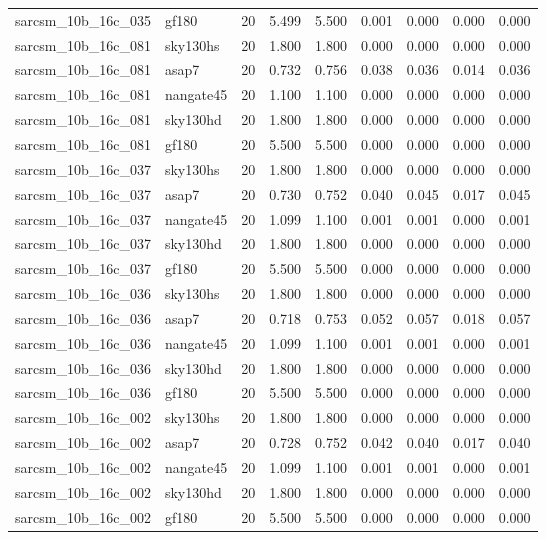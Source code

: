 \begin{tabular}{llrrrrrrr}
sarcsm\_10b\_16c\_035 & gf180 & 20 & 5.499 & 5.500 & 0.001 & 0.000 & 0.000 & 0.000 \\
sarcsm\_10b\_16c\_081 & sky130hs & 20 & 1.800 & 1.800 & 0.000 & 0.000 & 0.000 & 0.000 \\
sarcsm\_10b\_16c\_081 & asap7 & 20 & 0.732 & 0.756 & 0.038 & 0.036 & 0.014 & 0.036 \\
sarcsm\_10b\_16c\_081 & nangate45 & 20 & 1.100 & 1.100 & 0.000 & 0.000 & 0.000 & 0.000 \\
sarcsm\_10b\_16c\_081 & sky130hd & 20 & 1.800 & 1.800 & 0.000 & 0.000 & 0.000 & 0.000 \\
sarcsm\_10b\_16c\_081 & gf180 & 20 & 5.500 & 5.500 & 0.000 & 0.000 & 0.000 & 0.000 \\
sarcsm\_10b\_16c\_037 & sky130hs & 20 & 1.800 & 1.800 & 0.000 & 0.000 & 0.000 & 0.000 \\
sarcsm\_10b\_16c\_037 & asap7 & 20 & 0.730 & 0.752 & 0.040 & 0.045 & 0.017 & 0.045 \\
sarcsm\_10b\_16c\_037 & nangate45 & 20 & 1.099 & 1.100 & 0.001 & 0.001 & 0.000 & 0.001 \\
sarcsm\_10b\_16c\_037 & sky130hd & 20 & 1.800 & 1.800 & 0.000 & 0.000 & 0.000 & 0.000 \\
sarcsm\_10b\_16c\_037 & gf180 & 20 & 5.500 & 5.500 & 0.000 & 0.000 & 0.000 & 0.000 \\
sarcsm\_10b\_16c\_036 & sky130hs & 20 & 1.800 & 1.800 & 0.000 & 0.000 & 0.000 & 0.000 \\
sarcsm\_10b\_16c\_036 & asap7 & 20 & 0.718 & 0.753 & 0.052 & 0.057 & 0.018 & 0.057 \\
sarcsm\_10b\_16c\_036 & nangate45 & 20 & 1.099 & 1.100 & 0.001 & 0.001 & 0.000 & 0.001 \\
sarcsm\_10b\_16c\_036 & sky130hd & 20 & 1.800 & 1.800 & 0.000 & 0.000 & 0.000 & 0.000 \\
sarcsm\_10b\_16c\_036 & gf180 & 20 & 5.500 & 5.500 & 0.000 & 0.000 & 0.000 & 0.000 \\
sarcsm\_10b\_16c\_002 & sky130hs & 20 & 1.800 & 1.800 & 0.000 & 0.000 & 0.000 & 0.000 \\
sarcsm\_10b\_16c\_002 & asap7 & 20 & 0.728 & 0.752 & 0.042 & 0.040 & 0.017 & 0.040 \\
sarcsm\_10b\_16c\_002 & nangate45 & 20 & 1.099 & 1.100 & 0.001 & 0.001 & 0.000 & 0.001 \\
sarcsm\_10b\_16c\_002 & sky130hd & 20 & 1.800 & 1.800 & 0.000 & 0.000 & 0.000 & 0.000 \\
sarcsm\_10b\_16c\_002 & gf180 & 20 & 5.500 & 5.500 & 0.000 & 0.000 & 0.000 & 0.000 \\

\end{tabular}
